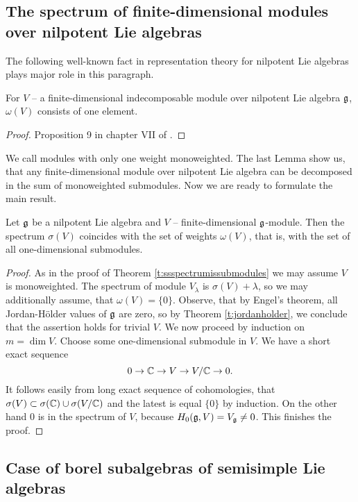 \subsection{The spectrum of finite-dimensional modules over nilpotent Lie algebras}
The following well-known fact in representation theory for nilpotent Lie algebras plays major role
in this paragraph.
\begin{lemma} \label{l:nilpdecomp}
    For $V$ -- a finite-dimensional indecomposable module over nilpotent Lie algebra $\mathfrak{g}$,
    $\omega(V)$ consists of one element.
\end{lemma}
\begin{proof}
    Proposition 9 in chapter VII of \cite{bourbaki}.
\end{proof}
We call modules with only one weight monoweighted. The last Lemma show us, that any
finite-dimensional module over nilpotent Lie algebra can be decomposed in the sum of monoweighted
submodules.  Now we are ready to formulate the main result.
\begin{theorem} \label{t:nilpspectrum}
    Let $\mathfrak{g}$ be a nilpotent Lie algebra and $V$ -- finite-dimensional $\mathfrak{g}$-module. Then the
    spectrum $\sigma(V)$ coincides with the set of weights $\omega(V)$, that is, with the set of
    all one-dimensional submodules.
\end{theorem}
\begin{proof}
    As in the proof of Theorem \ref{t:ssspectrumissubmodules} we may assume $V$ is monoweighted. The
    spectrum of module $V_{\lambda}$ is $\sigma(V) + \lambda$, so we may additionally assume, that
    $\omega(V) = \{0\}$. Observe, that by Engel's theorem, all Jordan-H{\"o}lder values of $\mathfrak{g}$
    are zero, so by Theorem \ref{t:jordanholder}, we conclude that the assertion holds for trivial
    $V$. We now proceed by induction on $m = \dim V$. Choose some one-dimensional submodule in $V$.
    We have a short exact sequence
    \[
        0\to \mathbb{C} \to V \to V/\mathbb{C} \to 0.
    \]
    It follows easily from long exact sequence of cohomologies, that $\sigma(V) \subset
    \sigma(\mathbb{C}) \cup \sigma(V/\mathbb{C})$ and the latest is equal $\{0\}$ by induction. On the other hand
    $0$ is in the spectrum of $V$, because $H_0(\mathfrak{g}, V) = V_{\mathfrak{g}} \neq 0$. This finishes the
    proof.
\end{proof}

\subsection{Case of borel subalgebras of semisimple Lie algebras}

